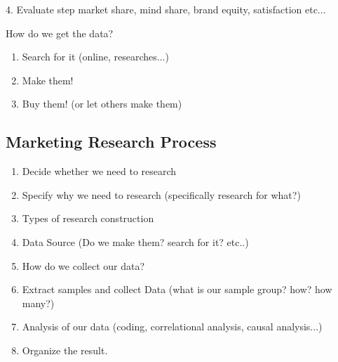 \documentclass[12pt]{article}
\begin{document}
4. Evaluate step
market share, mind share, brand equity, satisfaction etc...



How do we get the data?
\begin{enumerate}
	\item Search for it (online, researches...)
	\item Make them!
	\item Buy them! (or let others make them)
\end{enumerate}

\subsection{Marketing Research Process}

\begin{enumerate}
	\item Decide whether we need to research
	\item Specify why we need to research (specifically research for what?)
	\item Types of research construction
	\item Data Source (Do we make them? search for it? etc..)
	\item How do we collect our data?
	\item Extract samples and collect Data (what is our sample group? how? how many?)
	\item Analysis of our data (coding, correlational analysis, causal analysis...)
	\item Organize the result.
\end{enumerate}
\end{document}
